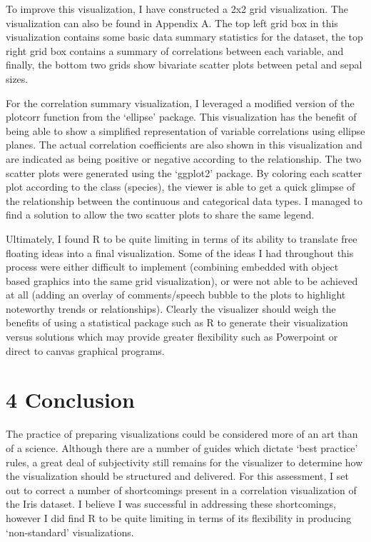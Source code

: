 \documentclass[]{article}
\begin{document}
To improve this visualization, I have constructed a 2x2 grid
visualization. The visualization can also be found in Appendix A. The
top left grid box in this visualization contains some basic data summary
statistics for the dataset, the top right grid box contains a summary of
correlations between each variable, and finally, the bottom two grids
show bivariate scatter plots between petal and sepal sizes.

For the correlation summary visualization, I leveraged a modified
version of the plotcorr function from the `ellipse' package. This
visualization has the benefit of being able to show a simplified
representation of variable correlations using ellipse planes. The actual
correlation coefficients are also shown in this visualization and are
indicated as being positive or negative according to the relationship.
The two scatter plots were generated using the `ggplot2' package. By
coloring each scatter plot according to the class (species), the viewer
is able to get a quick glimpse of the relationship between the
continuous and categorical data types. I managed to find a solution to
allow the two scatter plots to share the same legend.

Ultimately, I found R to be quite limiting in terms of its ability to
translate free floating ideas into a final visualization. Some of the
ideas I had throughout this process were either difficult to implement
(combining embedded with object based graphics into the same grid
visualization), or were not able to be achieved at all (adding an
overlay of comments/speech bubble to the plots to highlight noteworthy
trends or relationships). Clearly the visualizer should weigh the
benefits of using a statistical package such as R to generate their
visualization versus solutions which may provide greater flexibility
such as Powerpoint or direct to canvas graphical programs.

\section{4 Conclusion}\label{conclusion}

The practice of preparing visualizations could be considered more of an
art than of a science. Although there are a number of guides which
dictate `best practice' rules, a great deal of subjectivity still
remains for the visualizer to determine how the visualization should be
structured and delivered. For this assessment, I set out to correct a
number of shortcomings present in a correlation visualization of the
Iris dataset. I believe I was successful in addressing these
shortcomings, however I did find R to be quite limiting in terms of its
flexibility in producing `non-standard' visualizations.
\end{document}
